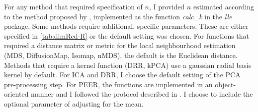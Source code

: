 For any method that required specification of \(n\), I provided \(n\) estimated according to the method proposed by \citet{Kayo2006}, implemented as the function \textit{calc}\_\textit{k} in the \textit{lle} package. Some methods require additional, specific parameters. These are either specified in \cref{tab:dimRed-R} or the default setting was chosen. For functions that required a distance matrix or metric for the local neighbourhood estimation (MDS, DiffusionMap, Isomap, nMDS), the default is the Euclidean distance. Methods that require a kernel function (DRR, kPCA) use a gaussian radial basis kernel by default. For ICA and DRR, I choose the default setting of the PCA pre-processing step. For PEER, the functions are implemented in an object-oriented manner and I followed the protocol described in \citet{Stegle2012}. I choose to include the optional parameter of adjusting for the mean.  
%
